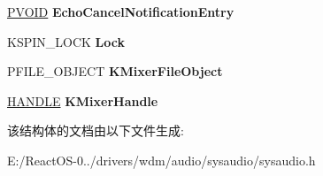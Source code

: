 \begin{DoxyCompactItemize}
\hyperlink{interfacevoid}{P\+V\+O\+ID} {\bfseries Echo\+Cancel\+Notification\+Entry}
\item 
\mbox{\label{struct_s_y_s_a_u_d_i_o_d_e_v_e_x_t_abb275e1548b36063d3cfe37a149e80bd}} 
K\+S\+P\+I\+N\+\_\+\+L\+O\+CK {\bfseries Lock}
\item 
\mbox{\label{struct_s_y_s_a_u_d_i_o_d_e_v_e_x_t_af6465d60eb0a844ef5a887b8e9c5721f}} 
P\+F\+I\+L\+E\+\_\+\+O\+B\+J\+E\+CT {\bfseries K\+Mixer\+File\+Object}
\item 
\mbox{\label{struct_s_y_s_a_u_d_i_o_d_e_v_e_x_t_afd953177a29a74d02e3dda0fd7fa9f9c}} 
\hyperlink{interfacevoid}{H\+A\+N\+D\+LE} {\bfseries K\+Mixer\+Handle}
\end{DoxyCompactItemize}


该结构体的文档由以下文件生成\+:\begin{DoxyCompactItemize}
\item 
E\+:/\+React\+O\+S-\/0../drivers/wdm/audio/sysaudio/sysaudio.\+h\end{DoxyCompactItemize}
